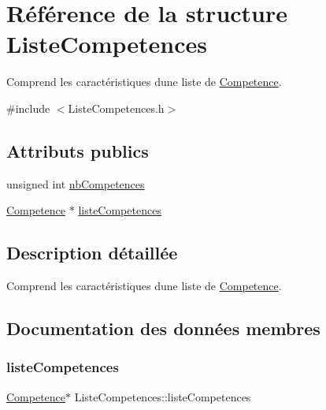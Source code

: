 \hypertarget{structListeCompetences}{}\section{Référence de la structure Liste\+Competences}
\label{structListeCompetences}


Comprend les caractéristiques d\textquotesingle{}une liste de \mbox{\hyperlink{structCompetence}{Competence}}.  




{\ttfamily \#include $<$Liste\+Competences.\+h$>$}

\subsection*{Attributs publics}
\begin{DoxyCompactItemize}
\item 
unsigned int \mbox{\hyperlink{structListeCompetences_ae477d9111fd3f822c8da9c67c32dfc51}{nb\+Competences}}
\item 
\mbox{\hyperlink{structCompetence}{Competence}} $\ast$ \mbox{\hyperlink{structListeCompetences_a050d1d71091db16df8ac0e07b82c39f7}{liste\+Competences}}
\end{DoxyCompactItemize}


\subsection{Description détaillée}
Comprend les caractéristiques d\textquotesingle{}une liste de \mbox{\hyperlink{structCompetence}{Competence}}. 

\subsection{Documentation des données membres}
\mbox{\label{structListeCompetences_a050d1d71091db16df8ac0e07b82c39f7}} 
\subsubsection{\texorpdfstring{liste\+Competences}{listeCompetences}}
{\footnotesize\ttfamily \mbox{\hyperlink{structCompetence}{Competence}}$\ast$ Liste\+Competences\+::liste\+Competences}

